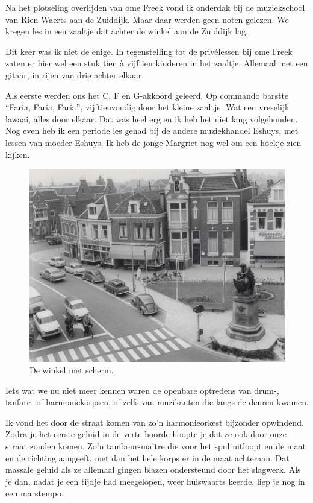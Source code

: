 \documentclass[10pt,twoside, openright]{memoir}
\begin{document}
Na het plotseling overlijden van ome Freek vond ik onderdak bij de muziekschool van Rien Waerts aan de Zuiddijk. Maar daar werden geen noten gelezen. We kregen les in een zaaltje dat achter de winkel aan de Zuiddijk lag. 

Dit keer was ik niet de enige. In tegenstelling tot de privélessen bij ome Freek zaten er hier wel een stuk tien à vijftien kinderen in het zaaltje. Allemaal met een gitaar, in rijen van drie achter elkaar. 

Als eerste werden ons het C, F en G-akkoord geleerd. Op commando barstte “Faria, Faria, Faria”, vijftienvoudig door het kleine zaaltje. Wat een vreselijk lawaai, alles door elkaar. Dat was heel erg en ik heb het niet lang volgehouden. Nog even heb ik een periode les gehad bij de andere muziekhandel Eshuys, met lessen van moeder Eshuys. Ik heb de jonge Margriet nog wel om een hoekje zien kijken. 

\begin{figure}
\includegraphics[width=\textwidth]{img/ch23/Eshuijs}
\caption*{\footnotesize De winkel met scherm.}
\end{figure}

Iets wat we nu niet meer kennen waren de openbare optredens van drum-, fanfare- of harmoniekorpsen, of zelfs van muzikanten die langs de deuren kwamen. 

Ik vond het door de straat komen van zo’n harmonieorkest bijzonder opwindend. Zodra je het eerste geluid in de verte hoorde hoopte je dat ze ook door onze straat zouden komen. Zo’n tambour-maître die voor het spul uitloopt en de maat en de richting aangeeft, met dan het hele korps er in de maat achteraan. Dat massale geluid als ze allemaal gingen blazen ondersteund door het slagwerk. Als je dan, nadat je een tijdje had meegelopen, weer huiswaarts keerde, liep je nog in een marstempo.
\end{document}
